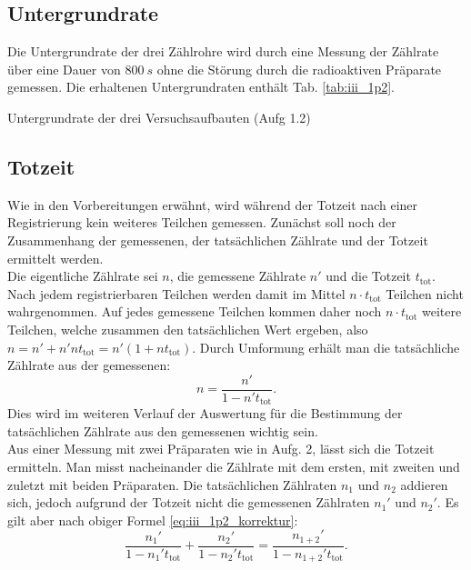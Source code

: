 \subsection{Untergrundrate}
Die Untergrundrate der drei Zählrohre wird durch eine Messung der Zählrate über eine Dauer von $\SI{800}{s}$ ohne die Störung durch die radioaktiven Präparate gemessen. Die erhaltenen Untergrundraten enthält Tab. \ref{tab:iii_1p2}.

\begin{table}[tb]
	\centering
	\caption{Untergrundrate der drei Versuchsaufbauten (Aufg 1.2)}
	\label{tab:iii_1p2}
	
\end{table}

\subsection{Totzeit}
Wie in den Vorbereitungen erwähnt, wird während der Totzeit nach einer Registrierung kein weiteres Teilchen gemessen. Zunächst soll noch der Zusammenhang der gemessenen, der tatsächlichen Zählrate und der Totzeit ermittelt werden.\\
Die eigentliche Zählrate sei $n$, die gemessene Zählrate $n'$ und die Totzeit $t_\mathrm{tot}$. Nach jedem registrierbaren Teilchen werden damit im Mittel $n \cdot t_\mathrm{tot}$ Teilchen nicht wahrgenommen. Auf jedes gemessene Teilchen kommen daher noch $n \cdot t_\mathrm{tot}$ weitere Teilchen, welche zusammen den tatsächlichen Wert ergeben, also $n = n' + n'nt_\mathrm{tot} = n'(1+nt_\mathrm{tot})$. Durch Umformung erhält man die tatsächliche Zählrate aus der gemessenen:
\begin{equation}
n = \frac{n'}{1-n't_\mathrm{tot}}. \label{eq:iii_1p2_korrektur}
\end{equation}
Dies wird im weiteren Verlauf der Auswertung für die Bestimmung der tatsächlichen Zählrate aus den gemessenen wichtig sein.\\
Aus einer Messung mit zwei Präparaten wie in Aufg. 2, lässt sich die Totzeit ermitteln. Man misst nacheinander die Zählrate mit dem ersten, mit zweiten und zuletzt mit beiden Präparaten. Die tatsächlichen Zählraten $n_1$ und $n_2$ addieren sich, jedoch aufgrund der Totzeit nicht die gemessenen Zählraten $n_1'$ und $n_2'$. Es gilt aber nach obiger Formel \eqref{eq:iii_1p2_korrektur}:
\begin{equation}
\frac{n_1'}{1-n_1't_\mathrm{tot}} + \frac{n_2'}{1-n_2't_\mathrm{tot}} = \frac{n_{1+2}'}{1-n_{1+2}'t_\mathrm{tot}}.
\end{equation}
